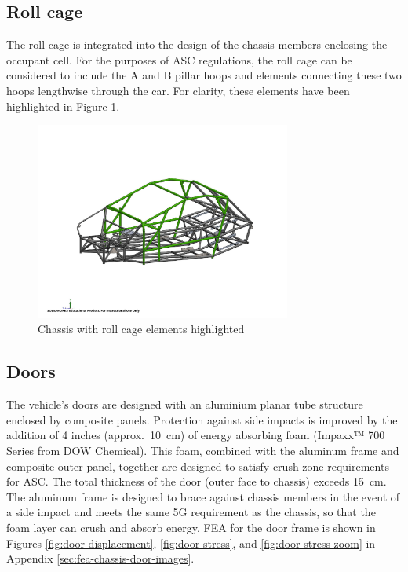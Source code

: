 \documentclass[10pt]{article}
\begin{document}
\subsection{Roll cage}
The roll cage is integrated into the design of the chassis members enclosing the occupant cell. For the purposes of ASC regulations, the roll cage can be considered to include the A and B pillar hoops and elements connecting these two hoops lengthwise through the car. For clarity, these elements have been highlighted in Figure \ref{fig:roll-cage}.

\begin{figure}
\centering
\includegraphics[width=0.75\textwidth]{figures/roll-cage}
\caption{Chassis with roll cage elements highlighted}
\label{fig:roll-cage}
\end{figure}

\subsection{Doors}
The vehicle's doors are designed with an aluminium planar tube structure enclosed by composite panels. Protection against side impacts is improved by the addition of 4 inches (approx.\ \SI{10}{\centi\meter}) of energy absorbing foam (Impaxx™ 700 Series from DOW Chemical). This foam, combined with the aluminum frame and composite outer panel, together are designed to satisfy crush zone requirements for ASC. The total thickness of the door (outer face to chassis) exceeds \SI{15}{\centi\meter}. The aluminum frame is designed to brace against chassis members in the event of a side impact and meets the same 5G requirement as the chassis, so that the foam layer can crush and absorb energy. FEA for the door frame is shown in Figures \ref{fig:door-displacement}, \ref{fig:door-stress}, and \ref{fig:door-stress-zoom} in Appendix \ref{sec:fea-chassis-door-images}.
\end{document}
